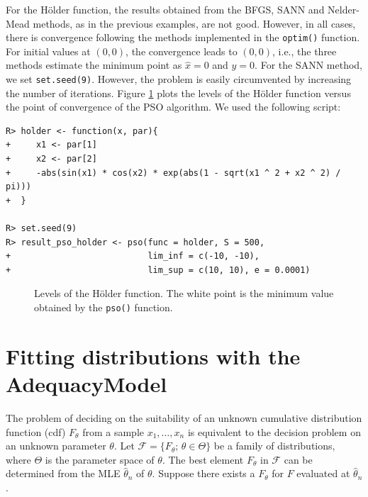 \documentclass[10pt,letterpaper]{article}
\begin{document}
For the H\"{o}lder function, the results obtained from the BFGS, SANN and Nelder-Mead methods, as in the previous examples, are not good.
However, in all cases, there is convergence following the methods implemented in the \texttt{optim()} function.
For initial values at $(0, 0)$, the convergence leads to $(0, 0)$, i.e., the three methods estimate the minimum point as $\widehat{x} = 0$ and $\widehat{y} = 0$.
For the SANN method, we set \texttt{set.seed(9)}.
However, the problem is easily circumvented by increasing the number of iterations.
Figure \ref{curves_holder}  plots the levels of the H\"{o}lder function versus the point of convergence of the PSO algorithm.
We used the following script:
\begin{verbatim}
R> holder <- function(x, par){
+     x1 <- par[1]
+     x2 <- par[2]
+     -abs(sin(x1) * cos(x2) * exp(abs(1 - sqrt(x1 ^ 2 + x2 ^ 2) / pi)))
+  }

R> set.seed(9)
R> result_pso_holder <- pso(func = holder, S = 500,
+                           lim_inf = c(-10, -10),
+                           lim_sup = c(10, 10), e = 0.0001)
\end{verbatim}

\begin{figure}[H]
\centering
\caption{Levels of the H\"{o}lder function.
The white point is the minimum value obtained by the \texttt{pso()} function.}
\label{curves_holder}
\end{figure}


\section{Fitting distributions with the AdequacyModel}

The problem of deciding on the suitability of an unknown cumulative distribution function (cdf) $F_\theta$
from a sample $x_1,\ldots,x_n$ is equivalent to the decision problem on an unknown parameter $\theta$.
Let $\mathcal{F} = \{F_\theta;\,\theta \in \Theta \}$ be a family of distributions, where $\Theta$ is the parameter space of $\theta$.
The best element $F_{\theta}$ in $\mathcal{F}$ can be determined from the MLE $\widehat{\theta}_n$ of $\theta$.
Suppose there exists a $F_{\theta}$ for $F$ evaluated at $\widehat{\theta}_n$.
\end{document}
